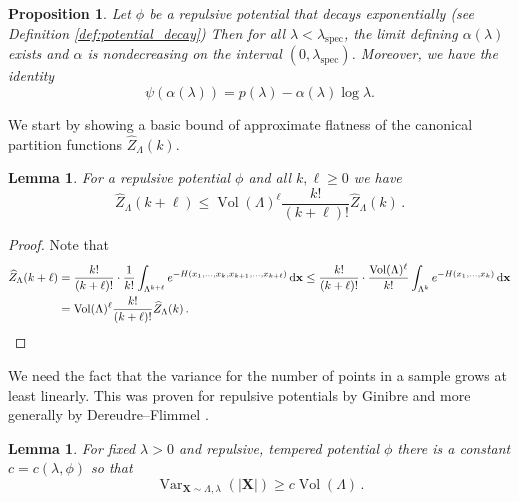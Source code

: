 \documentclass[10pt]{amsart}
\newtheorem{lemma}[theorem]{Lemma}
\newtheorem{proposition}[theorem]{Proposition}
\theoremstyle{definition}
\theoremstyle{remark}
\newcommand{\spec}{{\mathrm{spec}}}
\newcommand{\Vol}{\operatorname{Vol}}
\newcommand{\diff}{\mathrm{d}}
\newcommand{\Var}{{\operatorname{Var}}}
\begin{document}
	
	\begin{proposition}\label{prop:psi-exists}
		Let $\phi$ be a repulsive potential that decays exponentially (see Definition \ref{def:potential_decay})   Then for all $\lambda < \lambda_\spec$, the limit defining $\alpha(\lambda)$ exists and $\alpha$ is nondecreasing on the interval $(0,\lambda_\spec)$. Moreover, we have the identity
		$$\psi(\alpha(\lambda)) = p(\lambda) - \alpha(\lambda) \log \lambda.$$  
	\end{proposition}
	
	
	
	
	We start by showing a basic bound of approximate flatness of the canonical partition functions $\widehat{Z}_{\Lambda}(k)$. \begin{lemma} \label{lem:approximately-smooth}
		For a repulsive potential $\phi$ and all $k,\ell \geq 0$ we have \begin{equation*}
			\widehat{Z}_\Lambda(k + \ell) \leq \Vol(\Lambda)^\ell \frac{k!}{(k+\ell)!} \widehat{Z}_{\Lambda}(k)\,.
		\end{equation*}
	\end{lemma}
	\begin{proof}
		Note that \begin{align*}
			\widehat{Z}_\Lambda(k + \ell) &= \frac{k!}{(k+\ell)!} \cdot \frac{1}{k!} \int_{\Lambda^{k+\ell}} e^{-H(x_1,\ldots,x_k,x_{k+1},\ldots,x_{k+\ell})} \,\diff\mathbf{x} \leq   \frac{k!}{(k+\ell)!} \cdot \frac{\Vol(\Lambda)^\ell}{k!} \int_{\Lambda^{k}} e^{-H(x_1,\ldots,x_k)} \,\diff\mathbf{x} \\
			&= \Vol(\Lambda)^\ell \frac{k!}{(k+\ell)!} \widehat{Z}_{\Lambda}(k)\,. \qedhere 
		\end{align*}
	\end{proof}
	
	
	We need the fact that the variance for the number of points in a sample  grows at least linearly.  This was proven for repulsive potentials by Ginibre \cite{ginibre1967rigorous}  and more generally by Dereudre--Flimmel \cite{dereudre2024nonuniformity}.
	
	
	\begin{lemma}\label{lem:non-hyper-uniform}
		For fixed $\lambda > 0$ and repulsive, tempered potential $\phi$ there is a constant $c = c(\lambda,\phi)$ so that $$\Var_{\mathbf{X} \sim \Lambda,\lambda}(|\mathbf{X}|) \geq c \Vol(\Lambda)\,.$$
	\end{lemma}
	
\end{document}
